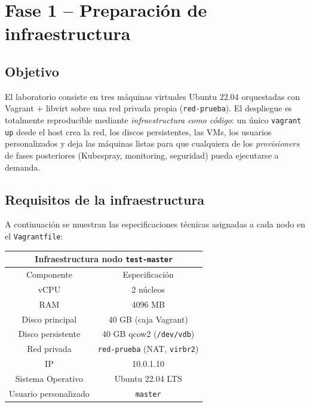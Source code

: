 \section{Fase 1 -- Preparación de infraestructura}

\subsection{Objetivo}
El laboratorio consiste en tres máquinas virtuales Ubuntu 22.04 orquestadas con Vagrant + libvirt sobre una red privada propia (\texttt{red-prueba}). El despliegue es totalmente reproducible mediante \emph{infraestructura como código}: un único \texttt{vagrant up} desde el host crea la red, los discos persistentes, las VMs, los usuarios personalizados y deja las máquinas listas para que cualquiera de los \emph{provisioners} de fases posteriores (Kubespray, monitoring, seguridad) pueda ejecutarse a demanda.

\subsection{Requisitos de la infraestructura}

A continuación se muestran las especificaciones técnicas asignadas a cada nodo en el \texttt{Vagrantfile}:

\begin{center}
  \begin{tabular}{|c|c|}
    \hline
    \multicolumn{2}{|c|}{Infraestructura nodo \texttt{test-master}} \\
    \hline
    Componente & Especificación \\
    \hline
    vCPU & 2 núcleos \\
    RAM & 4096 MB \\
    Disco principal & 40 GB (caja Vagrant) \\
    Disco persistente & 40 GB qcow2 (\texttt{/dev/vdb}) \\
    Red privada & \texttt{red-prueba} (NAT, \texttt{virbr2}) \\
    IP & 10.0.1.10 \\
    Sistema Operativo & Ubuntu 22.04 LTS \\
    Usuario personalizado & \texttt{master} \\
    \hline
  \end{tabular}
\end{center}

